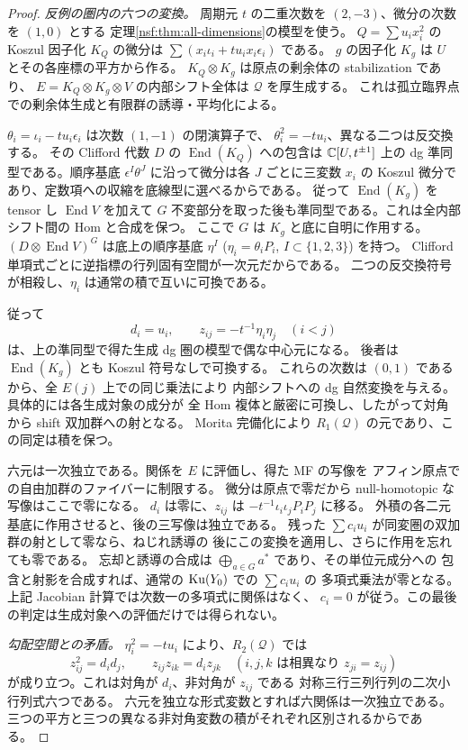 \begin{proof}
\emph{反例の圏内の六つの変換。}
周期元 $t$ の二重次数を $(2,-3)$、微分の次数を $(1,0)$ とする
定理\ref{nsf:thm:all-dimensions}の模型を使う。
$Q=\sum u_i x_i^2$ の Koszul 因子化 $K_Q$ の微分は
$\sum(x_i\iota_i+t u_ix_i\epsilon_i)$ である。
$g$ の因子化 $K_g$ は $U$ とその各座標の平方から作る。
$K_Q\otimes K_g$ は原点の剰余体の stabilization であり、
$E=K_Q\otimes K_g\otimes V$ の内部シフト全体は $\mathcal Q$ を厚生成する。
これは孤立臨界点での剰余体生成と有限群の誘導・平均化による。

$\theta_i=\iota_i-tu_i\epsilon_i$ は次数 $(1,-1)$ の閉演算子で、
$\theta_i^2=-tu_i$、異なる二つは反交換する。
その Clifford 代数 $D$ の $\operatorname{End}(K_Q)$ への包含は
$\mathbb C[U,t^{\pm1}]$ 上の dg 準同型である。順序基底
$\epsilon^I\theta^J$ に沿って微分は各 $J$ ごとに三変数 $x_i$ の
Koszul 微分であり、定数項への収縮を底線型に選べるからである。
従って $\operatorname{End}(K_g)$ を tensor し $\operatorname{End}V$ を加えて
$G$ 不変部分を取った後も準同型である。これは全内部シフト間の Hom と合成を保つ。
ここで $G$ は $K_g$ と底に自明に作用する。
$(D\otimes\operatorname{End}V)^G$ は底上の順序基底
$\eta^I$ ($\eta_i=\theta_iP_i$, $I\subset\{1,2,3\}$) を持つ。
Clifford 単項式ごとに逆指標の行列固有空間が一次元だからである。
二つの反交換符号が相殺し、$\eta_i$ は通常の積で互いに可換である。

従って
\[
 d_i=u_i,\qquad z_{ij}=-t^{-1}\eta_i\eta_j\quad(i<j)
\]
は、上の準同型で得た生成 dg 圏の模型で偶な中心元になる。
後者は $\operatorname{End}(K_g)$ とも Koszul 符号なしで可換する。
これらの次数は $(0,1)$ であるから、全 $E(j)$ 上での同じ乗法により
内部シフトへの dg 自然変換を与える。具体的には各生成対象の成分が
全 Hom 複体と厳密に可換し、したがって対角から shift 双加群への射となる。
Morita 完備化により $R_1(\mathcal Q)$ の元であり、この同定は積を保つ。

六元は一次独立である。関係を $E$ に評価し、得た MF の写像を
アフィン原点での自由加群のファイバーに制限する。
微分は原点で零だから null-homotopic な写像はここで零になる。
$d_i$ は零に、$z_{ij}$ は $-t^{-1}\iota_i\iota_j P_iP_j$ に移る。
外積の各二元基底に作用させると、後の三写像は独立である。
残った $\sum c_i u_i$ が同変圏の双加群の射として零なら、ねじれ誘導の
後にこの変換を適用し、さらに作用を忘れても零である。
忘却と誘導の合成は $\bigoplus_{a\in G}a^*$ であり、その単位元成分への
包含と射影を合成すれば、通常の $\operatorname{Ku}(Y_0)$ での $\sum c_i u_i$ の
多項式乗法が零となる。上記 Jacobian 計算では次数一の多項式に関係はなく、
$c_i=0$ が従う。この最後の判定は生成対象への評価だけでは得られない。

\emph{勾配空間との矛盾。}
$\eta_i^2=-tu_i$ により、$R_2(\mathcal Q)$ では
\[
 z_{ij}^2=d_id_j,\qquad z_{ij}z_{ik}=d_i z_{jk}
 \quad(i,j,k\text{ は相異なり } z_{ji}=z_{ij})
\]
が成り立つ。これは対角が $d_i$、非対角が $z_{ij}$ である
対称三行三列行列の二次小行列式六つである。
六元を独立な形式変数とすれば六関係は一次独立である。
三つの平方と三つの異なる非対角変数の積がそれぞれ区別されるからである。


\end{proof}
